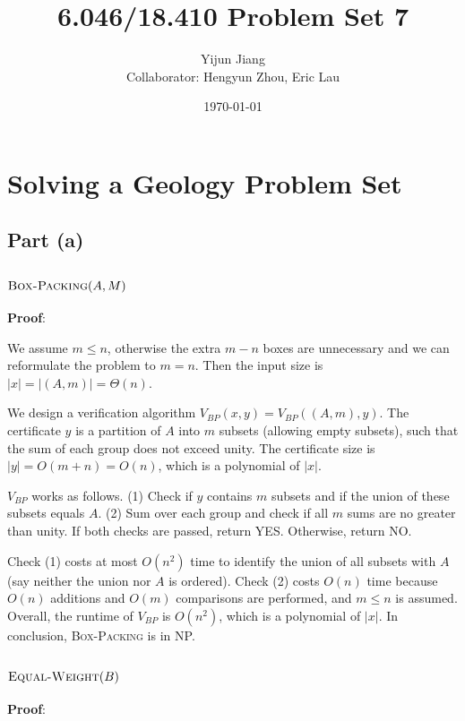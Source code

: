 \documentclass{article}
\title{6.046/18.410 Problem Set 7}
\author{Yijun Jiang\vspace{3pt}\\Collaborator: Hengyun Zhou, Eric Lau}
\date{\today}
\begin{document}
\maketitle

\section{Solving a Geology Problem Set}
\subsection{Part (a)}
\subsubsection{$\textsc{Box-Packing}(A,M)$}
\noindent\textbf{Proof}:

We assume $m\leqslant n$, otherwise the extra $m-n$ boxes are unnecessary and we can reformulate the problem to $m=n$. Then the input size is $|x|=|(A,m)|=\Theta(n)$.

We design a verification algorithm $V_{BP}(x,y)=V_{BP}((A,m),y)$. The certificate $y$ is a partition of $A$ into $m$ subsets (allowing empty subsets), such that the sum of each group does not exceed unity. The certificate size is $|y|=O(m+n)=O(n)$, which is a polynomial of $|x|$.

$V_{BP}$ works as follows. (1) Check if $y$ contains $m$ subsets and if the union of these subsets equals $A$. (2) Sum over each group and check if all $m$ sums are no greater than unity. If both checks are passed, return YES. Otherwise, return NO.

Check (1) costs at most $O(n^2)$ time to identify the union of all subsets with $A$ (say neither the union nor $A$ is ordered). Check (2) costs $O(n)$ time because $O(n)$ additions and $O(m)$ comparisons are performed, and $m\leqslant n$ is assumed. Overall, the runtime of $V_{BP}$ is $O(n^2)$, which is a polynomial of $|x|$. In conclusion, \textsc{Box-Packing} is in NP.


\subsubsection{$\textsc{Equal-Weight}(B)$}
\noindent\textbf{Proof}:
\end{document}
